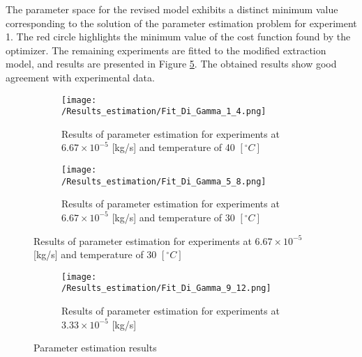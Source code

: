 \documentclass[../Supercritical_fluid_extraction_of_essential_oil_from_chamomile.tex]{subfiles}
\begin{document}
	The parameter space for the revised model exhibits a distinct minimum value corresponding to the solution of the parameter estimation problem for experiment 1. The red circle highlights the minimum value of the cost function found by the optimizer. The remaining experiments are fitted to the modified extraction model, and results are presented in Figure \ref{fig: Fit_Di_Gamma}. The obtained results show good agreement with experimental data. 

	\begin{figure}[!h]
		\centering
		\begin{subfigure}[b]{\columnwidth}
			\centering
			\texttt{[image: /Results\_estimation/Fit\_Di\_Gamma\_1\_4.png]}
			\caption{Results of parameter estimation for experiments at $6.67\times 10^{-5}$ [kg/s] and temperature of 40 $[^\circ C]$}
			\label{fig: Fit_1_4_Di_Gamma}
		\end{subfigure}
		\hfill
		\begin{subfigure}[b]{\columnwidth}
			\centering
			\texttt{[image: /Results\_estimation/Fit\_Di\_Gamma\_5\_8.png]}
			\caption{Results of parameter estimation for experiments at $6.67\times 10^{-5}$ [kg/s] and temperature of 30 $[^\circ C]$}
			\label{fig: Fit_5_8_Di_Gamma}
		\end{subfigure}
			\end{figure}%
		\begin{figure}[h!]\ContinuedFloat
		\begin{subfigure}[b]{\columnwidth}
			\centering
			\texttt{[image: /Results\_estimation/Fit\_Di\_Gamma\_9\_12.png]}
			\caption{Results of parameter estimation for experiments at $3.33\times 10^{-5}$ [kg/s]}
			\label{fig: Fit_9_12_Di_Gamma}
		\end{subfigure}
		\caption{Parameter estimation results}
		\label{fig: Fit_Di_Gamma}
	\end{figure}
	
\end{document}
